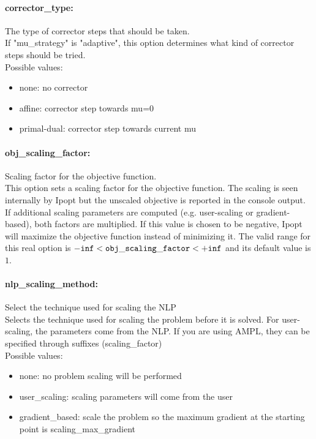 \documentclass[letter,10pt]{article}
\begin{document}
\paragraph{corrector\_type:} The type of corrector steps that should be taken. $\;$ \\
 If "mu\_strategy" is "adaptive", this option
determines what kind of corrector steps should be
tried.\\ 
Possible values:
\begin{itemize}
   \item none: no corrector
   \item affine: corrector step towards mu=0
   \item primal-dual: corrector step towards current mu
\end{itemize}

\paragraph{obj\_scaling\_factor:} Scaling factor for the objective function. $\;$ \\
 This option sets a scaling factor for the
objective function. The scaling is seen
internally by Ipopt but the unscaled objective is
reported in the console output. If additional
scaling parameters are computed (e.g.
user-scaling or gradient-based), both factors are
multiplied. If this value is chosen to be
negative, Ipopt will maximize the objective
function instead of minimizing it. The valid range for this real option is 
${\tt -inf} <  {\tt obj\_scaling\_factor } <  {\tt +inf}$
and its default value is $1$.


\paragraph{nlp\_scaling\_method:} Select the technique used for scaling the NLP $\;$ \\
 Selects the technique used for scaling the
problem before it is solved. For user-scaling,
the parameters come from the NLP. If you are
using AMPL, they can be specified through
suffixes (scaling\_factor)\\ 
Possible values:
\begin{itemize}
   \item none: no problem scaling will be performed
   \item user\_scaling: scaling parameters will come from the user
   \item gradient\_based: scale the problem so the maximum gradient at
the starting point is scaling\_max\_gradient
\end{itemize}
\end{document}
